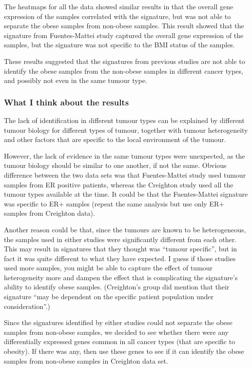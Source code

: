 \documentclass[a4paper, 11pt]{article}
\begin{document}
The heatmaps for all the data showed similar results in that the overall gene expression of the samples correlated with the signature, but was not able to separate the obese samples from non-obese samples.
This result showed that the signature from Fuentes-Mattei study captured the overall gene expression of the samples, but the signature was not specific to the BMI status of the samples.

These results suggested that the signatures from previous studies are not able to identify the obese samples from the non-obese samples in different cancer types, and possibly not even in the same tumour type.

\subsubsection*{What I think about the results}

The lack of identification in different tumour types can be explained by different tumour biology for different types of tumour, together with tumour heterogeneity and other factors that are specific to the local environment of the tumour.

However, the lack of evidence in the same tumour types were unexpected, as the tumour biology should be similar to one another, if not the same.
Obvious difference between the two data sets was that Fuentes-Mattei study used tumour samples from ER positive patients, whereas the Creighton study used all the tumour types available at the time.
It could be that the Fuentes-Mattei signature was specific to ER+ samples (repeat the same analysis but use only ER+ samples from Creighton data).

Another reason could be that, since the tumours are known to be heterogeneous, the samples used in either studies were significantly different from each other.
This may result in signatures that they thought was ``tumour specific'', but in fact it was quite different to what they have expected.
I guess if those studies used more samples, you might be able to capture the effect of tumour heterogeneity more and dampen the effect that is complicating the signature's ability to identify obese samples.
(Creighton's group did mention that their signature ``may be dependent on the specific patient population under consideration''.)\\
\newline

Since the signatures identified by either studies could not separate the obese samples from non-obese samples, we decided to see whether there were any differentially expressed genes common in all cancer types (that are specific to obesity).
If there was any, then use these genes to see if it can identify the obese samples from non-obese samples in Creighton data set.
\end{document}
